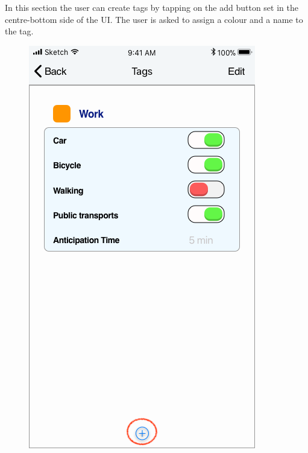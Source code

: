 \newpage
{}
In this section the user can create tags by tapping on the add button set in the centre-bottom side of the UI.
The user is asked to assign a colour and a name to the tag.
\begin{figure}[H]
	\centering
	\includegraphics[scale=0.23]{Images/Interface/Tags/1_tags+work_add}
	\hspace{0.5cm}

\end{figure}
